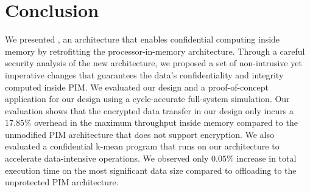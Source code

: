 







\section{Conclusion}
We presented \thename, an architecture that enables confidential computing inside memory by retrofitting the processor-in-memory architecture. Through a careful security analysis of the new architecture, we proposed a set of non-intrusive yet imperative changes that guarantees the data's confidentiality and integrity computed inside PIM. We evaluated our design and a proof-of-concept application for our design using a cycle-accurate full-system simulation. Our evaluation shows that the encrypted data transfer in our design only incurs a $17.85\%$ overhead in the maximum throughput inside memory compared to the unmodified PIM architecture that does not support encryption. We also evaluated a confidential k-mean program that runs on our architecture to accelerate data-intensive operations. We observed only $0.05$\% increase in total execution time on the most significant data size compared to offloading to the unprotected PIM architecture. 


